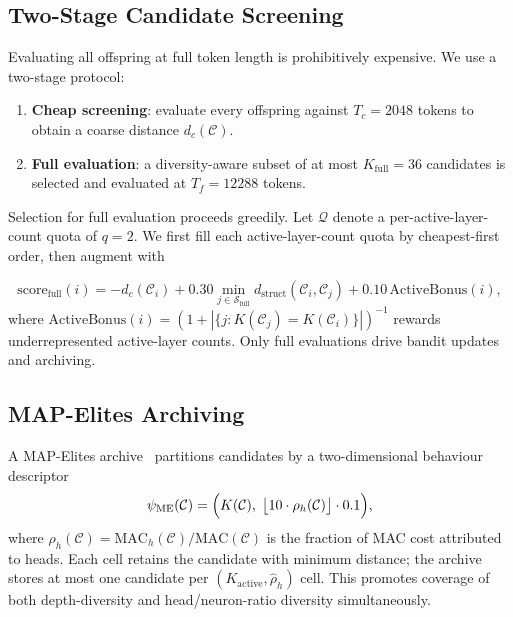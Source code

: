 \documentclass{article}
\newcommand{\Cc}{\mathcal{C}}
\newcommand{\Sc}{\mathcal{S}}
\newcommand{\dstruct}{d_{\mathrm{struct}}}
\newcommand{\MAC}{\mathrm{MAC}}
\begin{document}
\subsection{Two-Stage Candidate Screening}
\label{sec:twoeval}

Evaluating all offspring at full token length is prohibitively
expensive.  We use a two-stage protocol:

\begin{enumerate}[leftmargin=*]
  \item \textbf{Cheap screening}: evaluate every offspring against
    $T_c=2048$ tokens to obtain a coarse distance $d_c(\Cc)$.
  \item \textbf{Full evaluation}: a diversity-aware subset of at most
    $K_{\mathrm{full}}=36$ candidates is selected and evaluated at
    $T_f=12288$ tokens.
\end{enumerate}

Selection for full evaluation proceeds greedily.  Let $\mathcal{Q}$
denote a per-active-layer-count quota of $q=2$.  We first fill each
active-layer-count quota by cheapest-first order, then augment with

\begin{equation}
  \mathrm{score}_{\mathrm{full}}(i)
  = -d_c(\Cc_i)
  + 0.30\min_{j\in\Sc_{\mathrm{full}}}\dstruct(\Cc_i,\Cc_j)
  + 0.10\,\mathrm{ActiveBonus}(i),
  \label{eq:sel_full}
\end{equation}
where $\mathrm{ActiveBonus}(i)=(1+|\{j:K(\Cc_j)=K(\Cc_i)\}|)^{-1}$
rewards underrepresented active-layer counts.  Only full evaluations
drive bandit updates and archiving.

\subsection{MAP-Elites Archiving}
\label{sec:mapelites}

A MAP-Elites archive~\citep{mouret2015illuminating} partitions candidates
by a two-dimensional behaviour descriptor
\begin{equation}
  \psi_{\mathrm{ME}}(\Cc)
  = \Bigl(K(\Cc),\;
    \bigl\lfloor 10\cdot\rho_h(\Cc)\bigr\rfloor\cdot 0.1\Bigr),
\end{equation}
where $\rho_h(\Cc) = \MAC_h(\Cc)/\MAC(\Cc)$ is the fraction of MAC
cost attributed to heads.  Each cell retains the candidate with minimum
distance; the archive stores at most one candidate per
$(K_{\mathrm{active}}, \hat{\rho}_h)$ cell.  This promotes coverage of
both depth-diversity and head/neuron-ratio diversity simultaneously.
\end{document}
